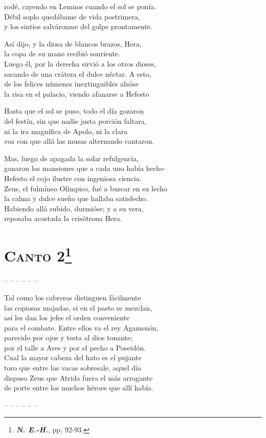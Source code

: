 \documentclass[11pt,twoside]{article}
\newcommand{\neh}{\emph{\textbf{N. E.-H.}}}
\begin{document}
rodé, cayendo en Lemnos cuando el sol se ponía.\\
Débil soplo quedábame de vida postrimera,\\
y los sintios salváronme del golpe prontamente.\par
Así dijo, y la diosa de blancos brazos, Hera,\\
la copa de su mano recibió sonriente.\\
Luego él, por la derecha sirvió a los otros dioses,\\
sacando de una crátera el dulce néctar. A esto,\\
de los felices númenes inextinguibles alzóse\\
la risa en el palacio, viendo afanarse a Hefesto\par
Hasta que el sol se puso, todo el día gozaron\\
del festín, sin que nadie justa porción faltara,\\
ni la ira magnífica de Apolo, ni la clara\\
voz con que allá las musas alternando cantaron.\par
Mas, luego de apagada la solar refulgencia,\\
ganaron las mansiones que a cada uno había hecho\\
Hefesto el cojo ilustre con ingeniosa ciencia.\\
Zeus, el fulmíneo Olímpico, fué a buscar en su lecho\\
la calma y dulce sueño que hallaba satisfecho.\\
Habiendo allá subido, durmióse; y a su vera,\\
reposaba acostada la crisótrona Hera.
\pend
\endnumbering
\newpage
%
\section*{\centering\textbf{\textsc{Canto} 2}\footnote{\neh, pp. 92-93.}}
%
\noindent-- -- -- -- -- --\par
%
\beginnumbering
\pstart
{}Tal como los cabreros distinguen fácilmente\\
las copiosas majadas, si en el pasto se mezclan,\\
así les dan los jefes el orden conveniente\\
para el combate. Entre ellos va el rey Agamenón,\\
parecido por ojos y testa al dios tonante;\\
por el talle a Ares y por el pecho a Poseidón.\\
Cual la mayor cabeza del hato es el pujante\\
toro que entre las vacas sobresale, aquel día\\
dispuso Zeus que Atrida fuera el más arrogante\\
de porte entre los muchos héroes que allí había.\par
\pend
\endnumbering
%
\noindent-- -- -- -- -- --\par
%
\newpage
%
\end{document}
